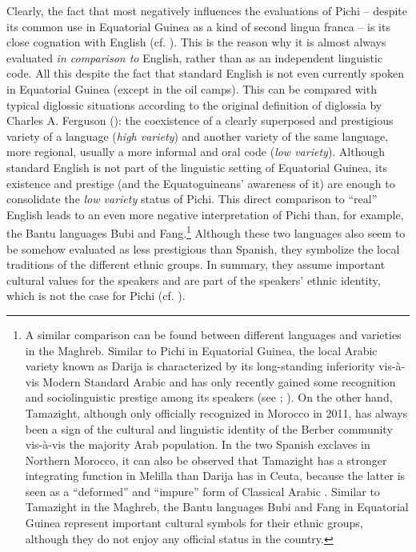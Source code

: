 \documentclass[output=paper]{langscibook}
\begin{document}
\largerpage
Clearly, the fact that most negatively influences the evaluations of Pichi – despite its common use in Equatorial Guinea as a kind of second lingua franca – is its close cognation with English (cf. \cite[218–220]{yakpo_o_2016}). This is the reason why it is almost always evaluated \textit{in comparison to} English, rather than as an independent linguistic code. All this despite the fact that standard English is not even currently spoken in Equatorial Guinea (except in the oil camps). This can be compared with typical diglossic situations according to the original definition of diglossia by Charles A. Ferguson (\citeyear{ferguson_diglossia_1959}): the coexistence of a clearly superposed and prestigious variety of a language (\textit{high variety}) and another variety of the same language, more regional, usually a more informal and oral code (\textit{low variety}). Although standard English is not part of the linguistic setting of Equatorial Guinea, its existence and prestige (and the Equatoguineans’ awareness of it) are enough to consolidate the \textit{low variety} status of Pichi. This direct comparison to ``real'' English leads to an even more negative interpretation of Pichi than, for example, the Bantu languages Bubi and Fang.\footnote{A similar comparison can be found between different languages and varieties in the Maghreb. Similar to Pichi in Equatorial Guinea, the local Arabic variety known as Darija is characterized by its long-standing inferiority vis-à-vis Modern Standard Arabic and has only recently gained some recognition and sociolinguistic prestige among its speakers (see \citealt{moustaoui_srhir_transforming_2019}; \citealt{moustaoui_srhir_arabe_2019}). On the other hand, Tamazight, although only officially recognized in Morocco in 2011, has always been a sign of the cultural and linguistic identity of the Berber community vis-à-vis the majority Arab population. In the two Spanish exclaves in Northern Morocco, it can also be observed that Tamazight has a stronger integrating function in Melilla than Darija has in Ceuta, because the latter is seen as a “deformed” and “impure” form of Classical Arabic \citep[39]{tilmatine_contacto_2011}. Similar to Tamazight in the Maghreb, the Bantu languages Bubi and Fang in Equatorial Guinea represent important cultural symbols for their ethnic groups, although they do not enjoy any official status in the country.}  Although these two languages also seem to be somehow evaluated as less prestigious than Spanish, they symbolize the local traditions of the different ethnic groups. In summary, they assume important cultural values for the speakers and are part of the speakers’ ethnic identity, which is not the case for Pichi (cf. \citealt[26ff.]{yakpo_only_2016}).
\end{document}

